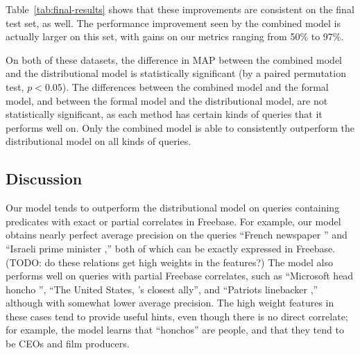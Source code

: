 \documentclass[11pt]{article}
\newcommand{\tabref}[1]{Table~\ref{tab:#1}}
\newcommand{\blank}{\underline{\hspace{.5cm}}}
\begin{document}
\tabref{final-results} shows that these improvements are consistent on
the final test set, as well.  The performance improvement seen by the
combined model is actually larger on this set, with gains on our
metrics ranging from 50\% to 97\%.

On both of these datasets, the difference in MAP between the combined
model and the distributional model is statistically significant (by a
paired permutation test, $p < 0.05$).  The differences between the
combined model and the formal model, and between the formal model and
the distributional model, are not statistically significant, as each
method has certain kinds of queries that it performs well on.  Only
the combined model is able to consistently outperform the
distributional model on all kinds of queries.

\subsection{Discussion}

Our model tends to outperform the distributional model on queries
containing predicates with exact or partial correlates in
Freebase. For example, our model obtains nearly perfect average
precision on the queries ``French newspaper \blank{}'' and ``Israeli
prime minister \blank{},'' both of which can be exactly expressed in
Freebase. (TODO: do these relations get high weights in the features?)
The model also performs well on queries with partial Freebase
correlates, such as ``Microsoft head honcho \blank{}'', ``The United
States, \blank{}'s closest ally'', and ``Patriots linebacker
\blank{},'' although with somewhat lower average precision. The high
weight features in these cases tend to provide useful hints, even
though there is no direct correlate; for example, the model learns
that ``honchos'' are people, and that they tend to be CEOs and film
producers.
\end{document}

